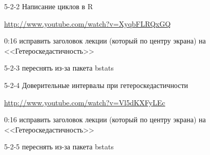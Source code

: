 \documentclass[12pt,a4paper]{article}
\begin{document}
5-2-2 Написание циклов в R

\url{http://www.youtube.com/watch?v=XyqbFLRQxGQ}

0:16 исправить заголовок лекции (который по центру экрана) на <<Гетероскедастичность>>

5-2-3 переснять из-за пакета bstats

5-2-4 Доверительные интервалы при гетероскедастичности

\url{http://www.youtube.com/watch?v=Vl5dKXFyLEc}

0:16 исправить заголовок лекции (который по центру экрана) на <<Гетероскедастичность>>

5-2-5 переснять из-за пакета bstats
\end{document}
